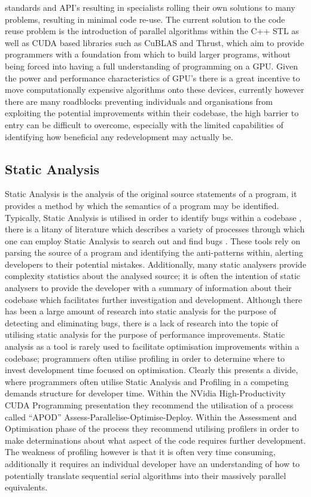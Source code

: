 standards and API’s resulting in specialists rolling their own solutions to many problems, resulting
in minimal code re-use. The current solution to the code reuse problem is the introduction of
parallel algorithms within the C++ STL as well as CUDA based libraries such as CuBLAS and Thrust,
which aim to provide programmers with a foundation from which to build larger programs, without
being forced into having a full understanding of programming on a GPU. Given the power and
performance characteristics of GPU’s there is a great incentive to move computationally expensive
algorithms onto these devices, currently however there are many roadblocks preventing individuals
and organisations from exploiting the potential improvements within their codebase, the high barrier
to entry can be difficult to overcome, especially with the limited capabilities of identifying how
beneficial any redevelopment may actually be.

\subsection{Static Analysis}
Static Analysis is the analysis of the original source statements of a program, it provides a method
by which the semantics of a program may be identified.  Typically, Static Analysis is utilised in
order to identify bugs within a codebase \cite{bessey2010few}, there is a litany of literature which
describes a variety of processes through which one can employ Static Analysis to search out and find
bugs \cite{ball2001automatically} \cite{bush2000static}. These tools rely on parsing the source of a
program and identifying the anti-patterns within, alerting developers to their potential mistakes.
Additionally, many static analysers provide complexity statistics about the analysed source; it is
often the intention of static analysers to provide the developer with a summary of information about
their codebase which facilitates further investigation and development.  Although there has been a
large amount of research into static analysis for the purpose of detecting and eliminating bugs,
there is a lack of research into the topic of utilising static analysis for the purpose of
performance improvements.  Static analysis as a tool is rarely used to facilitate optimisation
improvements within a codebase; programmers often utilise profiling in order to determine where to
invest development time focused on optimisation.  Clearly this presents a divide, where programmers
often utilise Static Analysis and Profiling in a competing demands structure for developer time.
Within the NVidia High-Productivity CUDA Programming presentation \cite{nvidiapresentation}
they recommend the utilisation of a process called “APOD” Assess-Parallelise-Optimise-Deploy.
Within the Assessment and Optimisation phase of the process they recommend utilising profilers in
order to make determinations about what aspect of the code requires further development. The
weakness of profiling however is that it is often very time consuming, additionally it requires an
individual developer have an understanding of how to potentially translate sequential serial
algorithms into their massively parallel equivalents. 
 

